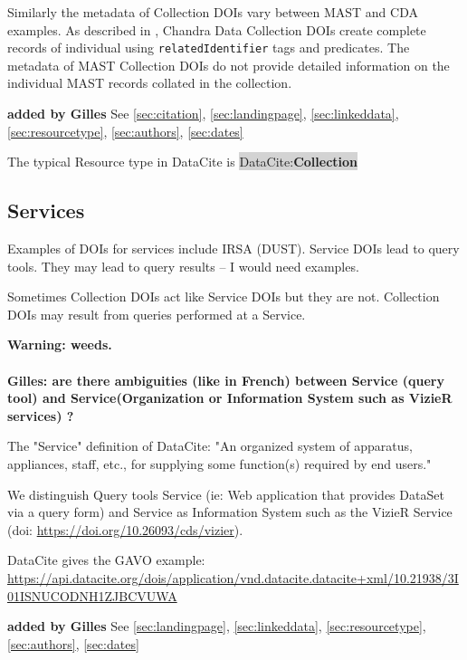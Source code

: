\documentclass[11pt,a4paper]{ivoa}
\newcommand{\dataciteterm}[1]{\colorbox{lightgray}{DataCite:\textbf{#1}}}
\begin{document}
Similarly the metadata of Collection DOIs vary between MAST and CDA examples. 
As described in \citet{2023ChNew..34....5D}, Chandra Data Collection DOIs create complete records of individual using \texttt{relatedIdentifier} tags and predicates. 
The metadata of MAST Collection DOIs do not provide detailed information on the individual MAST records collated in the collection.


\textbf{\color{red} added by Gilles}
See \ref{sec:citation}, \ref{sec:landingpage}, \ref{sec:linkeddata}, \ref{sec:resourcetype}, \ref{sec:authors}, \ref{sec:dates}

The typical Resource type in DataCite is \dataciteterm{Collection}

\subsection{Services}
\label{sec:intro:services}

Examples of DOIs for services include IRSA (DUST).
Service DOIs lead to query tools.
They may lead to query results -- I would need examples.

Sometimes Collection DOIs act like Service DOIs but they are not.
Collection DOIs may result from queries performed at a Service.

\textbf{Warning: weeds.}

\paragraph{}
\textbf{\color{red} Gilles: are there ambiguities (like in French) between Service (query tool) and Service(Organization or Information System such as VizieR services) ?\\}

{\color{red} 
    The "Service" definition of DataCite: "An organized system of apparatus, appliances, staff, etc., for supplying some function(s) required by end users."

    We distinguish Query tools Service (ie: Web application that provides DataSet via a query form) and Service as Information System such as the VizieR Service (doi: \url{https://doi.org/10.26093/cds/vizier}).

    DataCite gives the GAVO example: \url{https://api.datacite.org/dois/application/vnd.datacite.datacite+xml/10.21938/3I01ISNUCODNH1ZJBCVUWA}
}

\textbf{\color{red} added by Gilles}
See \ref{sec:landingpage}, \ref{sec:linkeddata}, \ref{sec:resourcetype}, \ref{sec:authors}, \ref{sec:dates}
\end{document}

